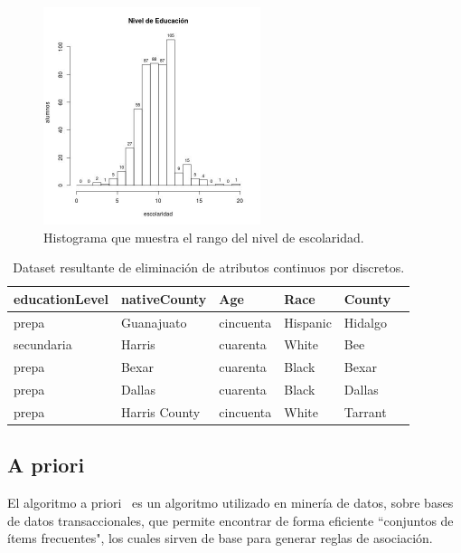 \documentclass[sigconf]{acmart}
\begin{document}
\begin{figure}[ht]
  \centering
  \includegraphics[width=2.5in]{escolaridad.jpg}
  \caption{Histograma que muestra el rango del nivel de  escolaridad.}
  \label{fig:rangoEscolaridad}
\end{figure}


\begin{table}[b]
\begin{center}
\begin{tabular}{llllll}
\toprule
educationLevel &   nativeCounty &        Age &      Race &   County \\
\midrule
         prepa &     Guanajuato &  cincuenta &  Hispanic &  Hidalgo \\
     secundaria &         Harris &   cuarenta &     White &      Bee \\
         prepa &          Bexar &   cuarenta &     Black &    Bexar \\
         prepa &         Dallas &   cuarenta &     Black &   Dallas \\
        prepa &  Harris County &  cincuenta &     White &  Tarrant \\
\bottomrule
\end{tabular}
\label{categorias}
\caption{Dataset resultante de eliminación de atributos continuos por discretos.}
\end{center}
\end{table}

\subsection{A priori} 
El algoritmo a priori~\cite{Raschka-rules} es un algoritmo utilizado en minería de datos, sobre bases de datos transaccionales, que permite encontrar de forma eficiente ``conjuntos de ítems frecuentes", los cuales sirven de base para generar reglas de asociación.
\end{document}
